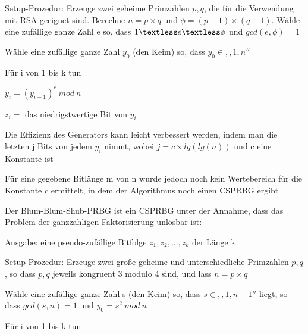 \documentclass[a4paper]{article}
\begin{document}
\begin{multicols}{3}
\begin{itemize*}
\begin{enumerate*}
                  \def\labelenumi{\arabic{enumi}.}
                  \item Setup-Prozedur: Erzeuge zwei geheime Primzahlen $p, q$, die für die Verwendung mit RSA geeignet sind. Berechne $n=p\times q$ und $\phi=(p-1)\times(q-1)$. Wähle eine zufällige ganze Zahl e so, dass $1\textless e\textless\phi$ und $gcd(e,\phi)=1$
                  \item Wähle eine zufällige ganze Zahl $y_0$ (den Keim) so, dass $y_0\in ,,1,n''$
                  \item Für i von 1 bis k tun
                  \begin{enumerate*} \def\labelenumii{\arabic{enumii}.} \item $y_i=(y_{i-1})^e\ mod\ n$ \item $z_i =$ das niedrigstwertige Bit von $y_i$ \end{enumerate*}
            \end{enumerate*}
            \begin{itemize*}
                  \item Die Effizienz des Generators kann leicht verbessert werden, indem man die letzten j Bits von jedem $y_i$ nimmt, wobei $j=c\times lg(lg(n))$ und c eine Konstante ist
                  \item Für eine gegebene Bitlänge m von n wurde jedoch noch kein Wertebereich für die Konstante c ermittelt, in dem der Algorithmus noch einen CSPRBG ergibt
            \end{itemize*}
            \item Der Blum-Blum-Shub-PRBG ist ein CSPRBG unter der Annahme, dass das
            Problem der ganzzahligen Faktorisierung unlösbar ist:
            \begin{itemize*}
                  \item Ausgabe: eine pseudo-zufällige Bitfolge $z_1,z_2,...,z_k$ der Länge k
            \end{itemize*}
            \begin{enumerate*}
                  \def\labelenumi{\arabic{enumi}.}
                  \item Setup-Prozedur: Erzeuge zwei große geheime und unterschiedliche Primzahlen $p,q$, so dass $p,q$ jeweils kongruent 3 modulo 4 sind, und lass $n=p\times q$
                  \item Wähle eine zufällige ganze Zahl s (den Keim) so, dass $s\in ,,1, n-1''$ liegt, so dass $gcd(s,n)=1$ und $y_0=s^2\ mod\ n$
                  \item Für i von 1 bis k tun

\end{enumerate*}
\end{itemize*}
\end{multicols}
\end{document}
